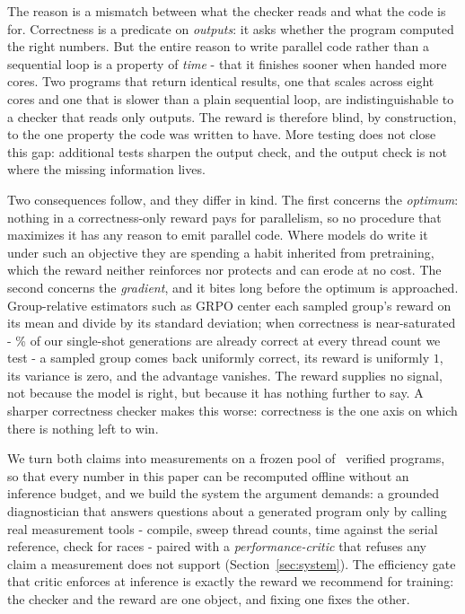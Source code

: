 The reason is a mismatch between what the checker reads and what the code is for. Correctness is a predicate on \emph{outputs}: it asks whether the program computed the right numbers. But the entire reason to write parallel code rather than a sequential loop is a property of \emph{time} - that it finishes sooner when handed more cores. Two programs that return identical results, one that scales across eight cores and one that is slower than a plain sequential loop, are indistinguishable to a checker that reads only outputs. The reward is therefore blind, by construction, to the one property the code was written to have. More testing does not close this gap: additional tests sharpen the output check, and the output check is not where the missing information lives.

Two consequences follow, and they differ in kind. The first concerns the \emph{optimum}: nothing in a correctness-only reward pays for parallelism, so no procedure that maximizes it has any reason to emit parallel code. Where models do write it under such an objective they are spending a habit inherited from pretraining, which the reward neither reinforces nor protects and can erode at no cost. The second concerns the \emph{gradient}, and it bites long before the optimum is approached. Group-relative estimators such as GRPO center each sampled group's reward on its mean and divide by its standard deviation; when correctness is near-saturated - \PassRate\% of our single-shot generations are already correct at every thread count we test - a sampled group comes back uniformly correct, its reward is uniformly $1$, its variance is zero, and the advantage vanishes. The reward supplies no signal, not because the model is right, but because it has nothing further to say. A sharper correctness checker makes this worse: correctness is the one axis on which there is nothing left to win.

We turn both claims into measurements on a frozen pool of \NAccepted\ verified programs, so that every number in this paper can be recomputed offline without an inference budget, and we build the system the argument demands: a grounded diagnostician that answers questions about a generated program only by calling real measurement tools - compile, sweep thread counts, time against the serial reference, check for races - paired with a \emph{performance-critic} that refuses any claim a measurement does not support (Section~\ref{sec:system}). The efficiency gate that critic enforces at inference is exactly the reward we recommend for training: the checker and the reward are one object, and fixing one fixes the other.

